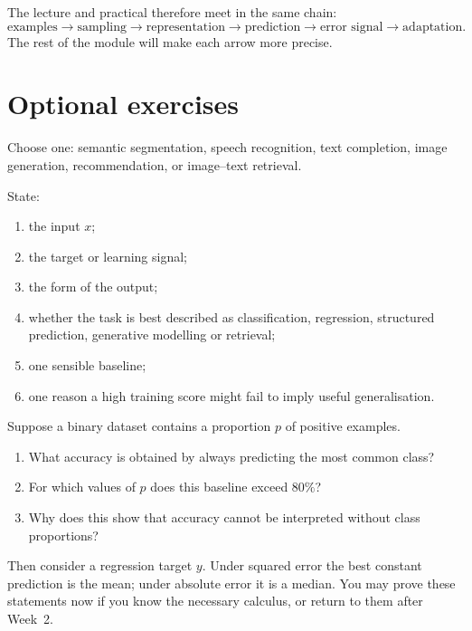 The lecture and practical therefore meet in the same chain:
\[
  \text{examples}
  \rightarrow
  \text{sampling}
  \rightarrow
  \text{representation}
  \rightarrow
  \text{prediction}
  \rightarrow
  \text{error signal}
  \rightarrow
  \text{adaptation}.
\]
The rest of the module will make each arrow more precise.

\section{Optional exercises}

\begin{optionalexercise}[title={1. Formalise a modern task}]
Choose one: semantic segmentation, speech recognition, text completion, image generation, recommendation, or image--text retrieval.

State:
\begin{enumerate}[leftmargin=*]
  \item the input \(x\);
  \item the target or learning signal;
  \item the form of the output;
  \item whether the task is best described as classification, regression, structured prediction, generative modelling or retrieval;
  \item one sensible baseline;
  \item one reason a high training score might fail to imply useful generalisation.
\end{enumerate}
\end{optionalexercise}

\begin{optionalexercise}[title={2. A constant predictor}]
Suppose a binary dataset contains a proportion \(p\) of positive examples.

\begin{enumerate}[leftmargin=*]
  \item What accuracy is obtained by always predicting the most common class?
  \item For which values of \(p\) does this baseline exceed \(80\%\)?
  \item Why does this show that accuracy cannot be interpreted without class proportions?
\end{enumerate}

Then consider a regression target \(y\). Under squared error the best constant prediction is the mean; under absolute error it is a median. You may prove these statements now if you know the necessary calculus, or return to them after Week~2.
\end{optionalexercise}


